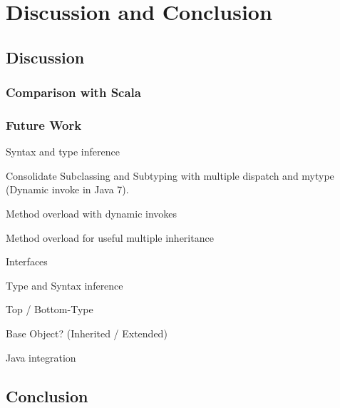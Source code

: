 \part{Discussion and Conclusion}
\chapter{Discussion}
\label{ctr:discussion}
\section{Comparison with Scala}
\label{sec:comparisonScala}

\section{Future Work}
\label{sec:futureWork}
Syntax and type inference


Consolidate Subclassing and Subtyping with multiple dispatch and mytype (Dynamic invoke in Java 7).

Method overload with dynamic invokes

Method overload for useful multiple inheritance

Interfaces

Type and Syntax inference

Top / Bottom-Type

Base Object? (Inherited / Extended)

Java integration


\chapter{Conclusion}
\label{ctr:conclusion}
